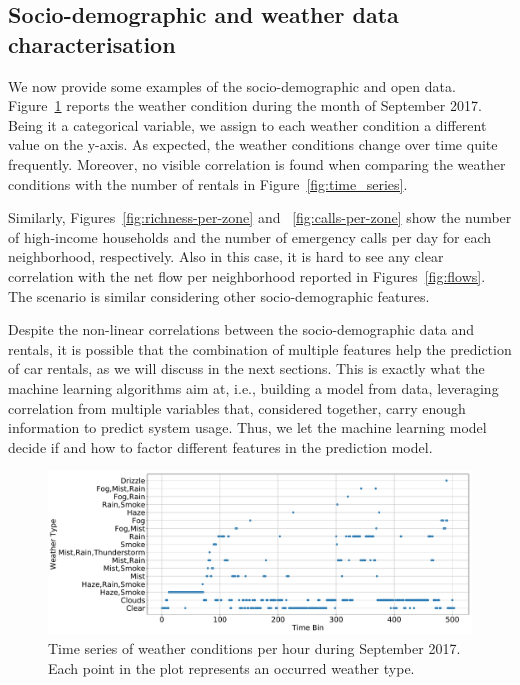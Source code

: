 \subsection{Socio-demographic and weather data characterisation}

We now provide some examples of the socio-demographic and open data. Figure~\ref{fig:weather-per-day} reports the weather condition during the month of September 2017. Being it a categorical variable, we assign to each weather condition a different value on the y-axis. As expected, the weather conditions change over time quite frequently. Moreover, no visible correlation is found when comparing the weather conditions with the number of rentals in Figure~\ref{fig:time_series}. 

Similarly, Figures~\ref{fig:richness-per-zone} and ~\ref{fig:calls-per-zone} show the number of high-income households and the number of emergency calls per day for each neighborhood, respectively. Also in this case, it is hard to see any clear correlation with the net flow per neighborhood reported in Figures~\ref{fig:flows}. 
The scenario is similar considering other socio-demographic features.

Despite the non-linear correlations between the socio-demographic data and rentals, it is possible that the combination of multiple features help the prediction of car rentals, as we will discuss in the next sections. 
This is exactly what the machine learning algorithms aim at, i.e., building a model from data, leveraging correlation from multiple variables that, considered together, carry enough information to predict system usage.
Thus, we let the machine learning model decide if and how to factor different features in the prediction model.

\begin{figure}
    \centering
    \includegraphics[width=0.8\columnwidth]{figures/temporal_characterization/WeatherPeriod2.pdf}
     \caption{Time series of weather conditions per hour during September 2017. Each point in the plot represents an occurred weather type.}
     \label{fig:weather-per-day}
\end{figure}



